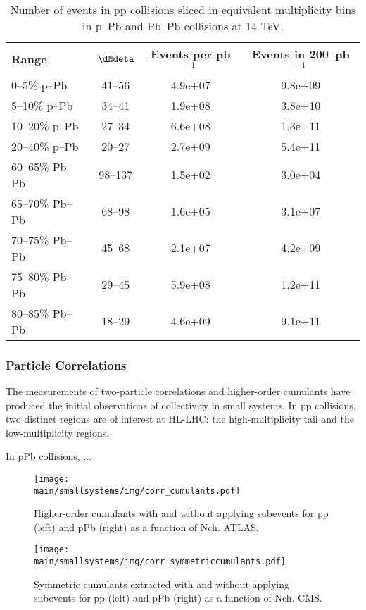 \documentclass[../report.tex]{subfiles}
\providecommand{\main}{..}
\begin{document}
\begin{table}
\centering
\begin{tabular}{l|c|c|c}
Range & $\dNdeta$ & Events per pb$^{-1}$ & Events in 200~pb$^{-1}$ \\
\hline
0--5\% p--Pb   & 41--56        & 4.9e+07       & 9.8e+09 \\
5--10\% p--Pb  & 34--41        & 1.9e+08       & 3.8e+10 \\
10--20\% p--Pb & 27--34        & 6.6e+08       & 1.3e+11 \\
20--40\% p--Pb & 20--27        & 2.7e+09       & 5.4e+11 \\
\hline
60--65\% Pb--Pb    & 98--137       & 1.5e+02       & 3.0e+04 \\
65--70\% Pb--Pb    & 68--98        & 1.6e+05       & 3.1e+07 \\ 
70--75\% Pb--Pb    & 45--68        & 2.1e+07       & 4.2e+09 \\
75--80\% Pb--Pb    & 29--45        & 5.9e+08       & 1.2e+11 \\
80--85\% Pb--Pb    & 18--29        & 4.6e+09       & 9.1e+11 \\
\hline
\end{tabular}
\caption{Number of events in pp collisions sliced in equivalent multiplicity bins in p--Pb and Pb--Pb collisions at 14 TeV.}
\end{table}



\subsubsection{Particle Correlations}

The measurements of two-particle correlations and higher-order cumulants have produced the initial observations of collectivity in small systems. In pp collisions, two distinct regions are of interest at HL-LHC: the high-multiplicity tail and the low-multiplicity regions. 

In pPb collisions, ...

\begin{figure}[ht]
\centering
\texttt{[image: \\main/smallsystems/img/corr\_cumulants.pdf]}
\caption{Higher-order cumulants with and without applying subevents for pp (left) and pPb (right) as a function of Nch. ATLAS.}
\label{fig:smallsystems_corr_cumulants}
\end{figure}

\begin{figure}[ht]
\centering
\texttt{[image: \\main/smallsystems/img/corr\_symmetriccumulants.pdf]}
\caption{Symmetric cumulants extracted with and without applying subevents for pp (left) and pPb (right) as a function of Nch. CMS.}
\label{fig:smallsystems_corr_symmetriccumulants}
\end{figure}
\end{document}
